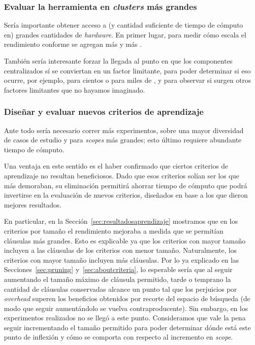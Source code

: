 \subsubsection{Evaluar la herramienta en \emph{clusters} más grandes}

Sería importante obtener acceso a (y cantidad suficiente de tiempo de cómputo
en) grandes cantidades de \emph{hardware}. En primer lugar, para medir cómo
escala el rendimiento conforme se agregan más y más \ws.

También sería interesante forzar la llegada al punto en que los componentes
centralizados sí se conviertan en un factor limitante, para poder determinar
si eso ocurre, por ejemplo, para cientos o para miles de \ws, y para observar
si surgen otros factores limitantes que no hayamos imaginado.


\subsubsection{Diseñar y evaluar nuevos criterios de aprendizaje}

Ante todo sería necesario correr más experimentos, sobre una mayor diversidad
de casos de estudio y para \emph{scopes} más grandes; esto último requiere
abundante tiempo de cómputo.

Una ventaja en este sentido es el haber confirmado que ciertos criterios de
aprendizaje no resultan beneficiosos. Dado que esos criterios solían ser los
que más demoraban, su eliminación permitirá ahorrar tiempo de cómputo que
podrá invertirse en la evaluación de nuevos criterios, diseñados en base a los
que dieron mejores resultados.

En particular, en la Sección~\ref{sec:resultadosaprendizaje} mostramos que en
los criterios por tamaño el rendimiento mejoraba a medida que se permitían
cláusulas más grandes. Esto es explicable ya que los criterios con mayor
tamaño incluyen a las cláusulas de los criterios con menor tamaño.
Naturalmente, los criterios con mayor tamaño incluyen más cláusulas. Por lo ya
explicado en las Secciones~\ref{sec:pruning} y~\ref{sec:aboutcriteria}, lo
esperable sería que al seguir aumentando el tamaño máximo de cláusula permitido,
tarde o temprano la cantidad de cláusulas conservadas alcance un punto tal que
los perjuicios por \emph{overhead} superen los beneficios obtenidos por recorte del
espacio de búsqueda (de modo que seguir aumentándolo se vuelva contraproducente).
Sin embargo, en los experimentos realizados no se llegó a este punto. Consideramos
que vale la pena seguir incrementando el tamaño permitido para poder determinar
dónde está este punto de inflexión y cómo se comporta con respecto al
incremento en \emph{scope}.


